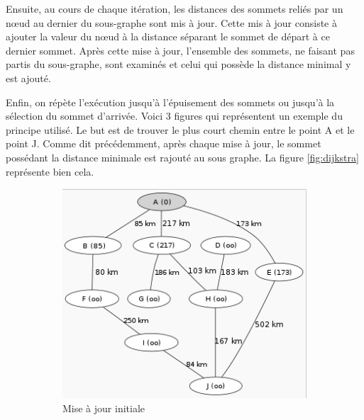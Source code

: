 Ensuite, au cours de chaque itération, les distances des sommets reliés par un nœud au dernier du sous-graphe sont mis à jour. Cette mis à jour consiste à ajouter la valeur du nœud à la distance séparant le sommet de départ à ce dernier sommet. Après cette mise à jour, l'ensemble des sommets, ne faisant pas partis du sous-graphe, sont examinés et celui qui possède la distance minimal y est ajouté.

Enfin, on répète l'exécution jusqu'à l'épuisement des sommets ou jusqu'à la sélection du sommet d'arrivée.
Voici 3 figures qui représentent un exemple du principe utilisé. Le but est de trouver le plus court chemin entre le point A et le point J. Comme dit précédemment, après chaque mise à jour, le sommet possédant la distance minimale est rajouté au sous graphe. La figure \ref{fig:dijkstra} représente bien cela.
\begin{figure}[h!]
        \centering
        \begin{subfigure}[h!]{0.4\textwidth}
                \includegraphics[width=\textwidth]{dijk1.png}
                \caption{Mise à jour initiale\\\(\;\)}
        \end{subfigure}   \begin{subfigure}[h!]{0.4\textwidth}

\end{subfigure}
\end{figure}
